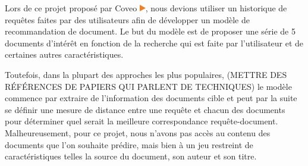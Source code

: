 Lors de ce projet proposé par Coveo \href{https://www.coveo.com/fr}{\includegraphics[height=0.3cm]{coveo_logo}}, nous devions utiliser un historique de requêtes faites par des utilisateurs afin de développer un modèle de recommandation de document. 
Le but du modèle est de proposer une série de 5 documents d'intérêt en fonction de la recherche qui est faite par l'utilisateur et de certaines autres caractéristiques.

Toutefois, dans la plupart des approches les plus populaires, (METTRE DES RÉFÉRENCES DE PAPIERS QUI PARLENT DE TECHNIQUES) le modèle commence par extraire de l'information des documents cible et peut par la suite se définir une mesure de distance entre une requête et chacun des documents pour déterminer quel serait la meilleure correspondance requête-document. 
Malheureusement, pour ce projet, nous n'avons pas accès au contenu des documents que l'on souhaite prédire, mais bien à un jeu restreint de caractéristiques telles la source du document, son auteur et son titre.

